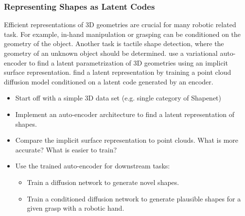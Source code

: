 \documentclass[a4paper]{article}
\begin{document}
\subsubsection{Representing Shapes as Latent Codes}
Efficient representations of 3D geometries are crucial for many robotic related task. 
For example, in-hand manipulation or grasping can be conditioned on the geometry of the object. 
Another task is tactile shape detection, where the geometry of an unknown object should be determined. 
\citet{Chou2023diffusion} use a variational auto-encoder to find a latent parametrization of 3D geometries using an implicit surface representation.
\citet{Luo2021diffusion} find a latent representation by training a point cloud diffusion model conditioned on a latent code generated by an encoder.
\begin{itemize}
  \item Start off with a simple 3D data set (e.g. single category of Shapenet)
  \item Implement an auto-encoder architecture to find a latent representation of shapes.
  \item Compare the implicit surface representation to point clouds. What is more accurate? What is easier to train?
  \item Use the trained auto-encoder for downstream tasks:
  \begin{itemize}
    \item Train a diffusion network to generate novel shapes.
    \item Train a conditioned diffusion network to generate plausible shapes for a given grasp with a robotic hand.
  \end{itemize}
\end{itemize}
\end{document}
